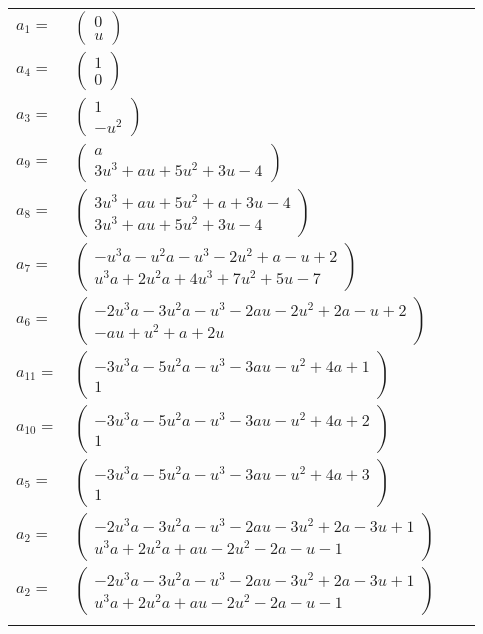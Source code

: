 \documentclass[1p]{elsarticle_modified}
\theoremstyle{definition}
\begin{document}
\begin{tabular}{m{7pt} m{180pt} m{7pt} m{180pt} }
\flushright $a_{1}=$&$\begin{pmatrix}0\\u\end{pmatrix}$ \\
\flushright $a_{4}=$&$\begin{pmatrix}1\\0\end{pmatrix}$ \\
\flushright $a_{3}=$&$\begin{pmatrix}1\\- u^2\end{pmatrix}$ \\
\flushright $a_{9}=$&$\begin{pmatrix}a\\3 u^3+a u+5 u^2+3 u-4\end{pmatrix}$ \\
\flushright $a_{8}=$&$\begin{pmatrix}3 u^3+a u+5 u^2+a+3 u-4\\3 u^3+a u+5 u^2+3 u-4\end{pmatrix}$ \\
\flushright $a_{7}=$&$\begin{pmatrix}- u^3 a- u^2 a- u^3-2 u^2+a- u+2\\u^3 a+2 u^2 a+4 u^3+7 u^2+5 u-7\end{pmatrix}$ \\
\flushright $a_{6}=$&$\begin{pmatrix}-2 u^3 a-3 u^2 a- u^3-2 a u-2 u^2+2 a- u+2\\- a u+u^2+a+2 u\end{pmatrix}$ \\
\flushright $a_{11}=$&$\begin{pmatrix}-3 u^3 a-5 u^2 a- u^3-3 a u- u^2+4 a+1\\1\end{pmatrix}$ \\
\flushright $a_{10}=$&$\begin{pmatrix}-3 u^3 a-5 u^2 a- u^3-3 a u- u^2+4 a+2\\1\end{pmatrix}$ \\
\flushright $a_{5}=$&$\begin{pmatrix}-3 u^3 a-5 u^2 a- u^3-3 a u- u^2+4 a+3\\1\end{pmatrix}$ \\
\flushright $a_{2}=$&$\begin{pmatrix}-2 u^3 a-3 u^2 a- u^3-2 a u-3 u^2+2 a-3 u+1\\u^3 a+2 u^2 a+a u-2 u^2-2 a- u-1\end{pmatrix}$\\ \flushright $a_{2}=$&$\begin{pmatrix}-2 u^3 a-3 u^2 a- u^3-2 a u-3 u^2+2 a-3 u+1\\u^3 a+2 u^2 a+a u-2 u^2-2 a- u-1\end{pmatrix}$\\&\end{tabular}
\end{document}
